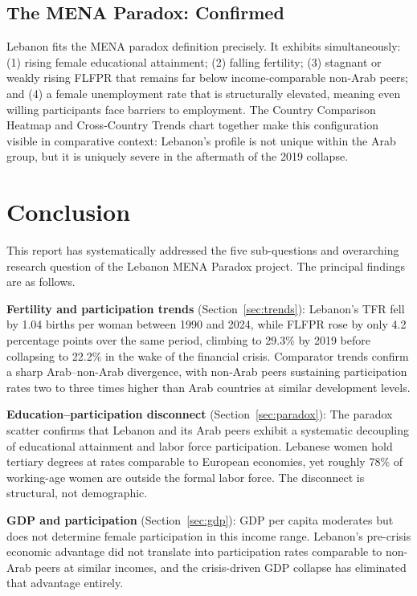 \documentclass[12pt,a4paper]{article}
\begin{document}
\subsection{The MENA Paradox: Confirmed}

Lebanon fits the MENA paradox definition precisely. It exhibits simultaneously: (1) rising female educational attainment; (2) falling fertility; (3) stagnant or weakly rising FLFPR that remains far below income-comparable non-Arab peers; and (4) a female unemployment rate that is structurally elevated, meaning even willing participants face barriers to employment. The Country Comparison Heatmap and Cross-Country Trends chart together make this configuration visible in comparative context: Lebanon's profile is not unique within the Arab group, but it is uniquely severe in the aftermath of the 2019 collapse.

\section{Conclusion}
\label{sec:conclusion}

This report has systematically addressed the five sub-questions and overarching research question of the Lebanon MENA Paradox project. The principal findings are as follows.

\textbf{Fertility and participation trends} (Section~\ref{sec:trends}): Lebanon's TFR fell by 1.04 births per woman between 1990 and 2024, while FLFPR rose by only 4.2 percentage points over the same period, climbing to 29.3\% by 2019 before collapsing to 22.2\% in the wake of the financial crisis. Comparator trends confirm a sharp Arab--non-Arab divergence, with non-Arab peers sustaining participation rates two to three times higher than Arab countries at similar development levels.

\textbf{Education--participation disconnect} (Section~\ref{sec:paradox}): The paradox scatter confirms that Lebanon and its Arab peers exhibit a systematic decoupling of educational attainment and labor force participation. Lebanese women hold tertiary degrees at rates comparable to European economies, yet roughly 78\% of working-age women are outside the formal labor force. The disconnect is structural, not demographic.

\textbf{GDP and participation} (Section~\ref{sec:gdp}): GDP per capita moderates but does not determine female participation in this income range. Lebanon's pre-crisis economic advantage did not translate into participation rates comparable to non-Arab peers at similar incomes, and the crisis-driven GDP collapse has eliminated that advantage entirely.
\end{document}
